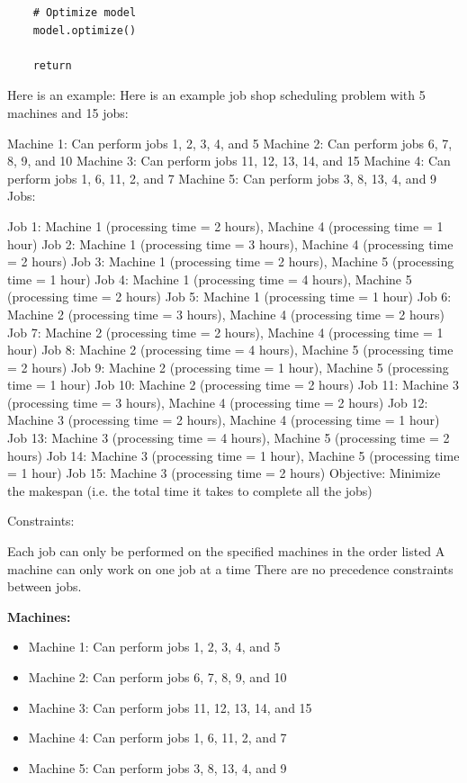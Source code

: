 {\begin{verbatim}
    # Optimize model
    model.optimize()

    return
\end{verbatim}

Here is an example:
Here is an example job shop scheduling problem with 5 machines and 15 jobs:

Machine 1: Can perform jobs 1, 2, 3, 4, and 5
Machine 2: Can perform jobs 6, 7, 8, 9, and 10
Machine 3: Can perform jobs 11, 12, 13, 14, and 15
Machine 4: Can perform jobs 1, 6, 11, 2, and 7
Machine 5: Can perform jobs 3, 8, 13, 4, and 9
Jobs:

Job 1: Machine 1 (processing time = 2 hours), Machine 4 (processing time = 1 hour)
Job 2: Machine 1 (processing time = 3 hours), Machine 4 (processing time = 2 hours)
Job 3: Machine 1 (processing time = 2 hours), Machine 5 (processing time = 1 hour)
Job 4: Machine 1 (processing time = 4 hours), Machine 5 (processing time = 2 hours)
Job 5: Machine 1 (processing time = 1 hour)
Job 6: Machine 2 (processing time = 3 hours), Machine 4 (processing time = 2 hours)
Job 7: Machine 2 (processing time = 2 hours), Machine 4 (processing time = 1 hour)
Job 8: Machine 2 (processing time = 4 hours), Machine 5 (processing time = 2 hours)
Job 9: Machine 2 (processing time = 1 hour), Machine 5 (processing time = 1 hour)
Job 10: Machine 2 (processing time = 2 hours)
Job 11: Machine 3 (processing time = 3 hours), Machine 4 (processing time = 2 hours)
Job 12: Machine 3 (processing time = 2 hours), Machine 4 (processing time = 1 hour)
Job 13: Machine 3 (processing time = 4 hours), Machine 5 (processing time = 2 hours)
Job 14: Machine 3 (processing time = 1 hour), Machine 5 (processing time = 1 hour)
Job 15: Machine 3 (processing time = 2 hours)
Objective: Minimize the makespan (i.e. the total time it takes to complete all the jobs)

Constraints:

Each job can only be performed on the specified machines in the order listed
A machine can only work on one job at a time
There are no precedence constraints between jobs.


\textbf{Machines:}
\begin{itemize}
    \item Machine 1: Can perform jobs 1, 2, 3, 4, and 5
    \item Machine 2: Can perform jobs 6, 7, 8, 9, and 10
    \item Machine 3: Can perform jobs 11, 12, 13, 14, and 15
    \item Machine 4: Can perform jobs 1, 6, 11, 2, and 7
    \item Machine 5: Can perform jobs 3, 8, 13, 4, and 9
\end{itemize}

}
